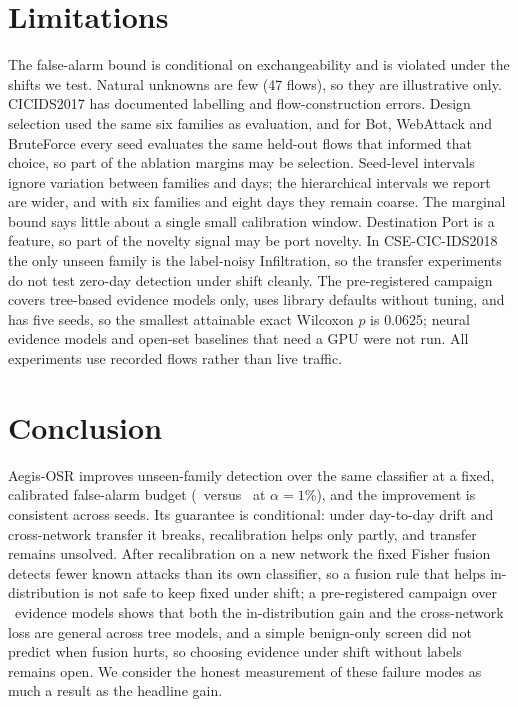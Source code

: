\documentclass[conference]{IEEEtran}
\begin{document}
\section{Limitations}
The false-alarm bound is conditional on exchangeability and is violated under the shifts we test. Natural unknowns are few (47 flows), so they are illustrative only. CICIDS2017 has documented labelling and flow-construction errors. Design selection used the same six families as evaluation, and for Bot, WebAttack and BruteForce every seed evaluates the same held-out flows that informed that choice, so part of the ablation margins may be selection. Seed-level intervals ignore variation between families and days; the hierarchical intervals we report are wider, and with six families and eight days they remain coarse. The marginal bound says little about a single small calibration window. Destination Port is a feature, so part of the novelty signal may be port novelty. In CSE-CIC-IDS2018 the only unseen family is the label-noisy Infiltration, so the transfer experiments do not test zero-day detection under shift cleanly. The pre-registered campaign covers tree-based evidence models only, uses library defaults without tuning, and has five seeds, so the smallest attainable exact Wilcoxon $p$ is 0.0625; neural evidence models and open-set baselines that need a GPU were not run. All experiments use recorded flows rather than live traffic.

\section{Conclusion}
Aegis-OSR improves unseen-family detection over the same classifier at a fixed, calibrated false-alarm budget (\LoafoOsrZdr\ versus \LoafoXgbZdr\ at $\alpha=1\%$), and the improvement is consistent across seeds. Its guarantee is conditional: under day-to-day drift and cross-network transfer it breaks, recalibration helps only partly, and transfer remains unsolved. After recalibration on a new network the fixed Fisher fusion detects fewer known attacks than its own classifier, so a fusion rule that helps in-distribution is not safe to keep fixed under shift; a pre-registered campaign over \FactRThreeModels\ evidence models shows that both the in-distribution gain and the cross-network loss are general across tree models, and a simple benign-only screen did not predict when fusion hurts, so choosing evidence under shift without labels remains open. We consider the honest measurement of these failure modes as much a result as the headline gain.
\end{document}
